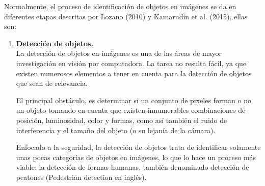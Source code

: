\documentclass[a4paper,12pt,oneside,spanish]{book}
\begin{document}
Normalmente, el proceso de identificación de objetos en imágenes se da en diferentes etapas descritas por Lozano (2010) y Kamarudin et al. (2015), ellas son:	
\begin{enumerate}[label=\alph*)]
	\item \textbf{Detección de objetos.}\\
		La detección de objetos en imágenes es una de las áreas de mayor investigación en visión por computadora. La tarea no resulta fácil, ya que existen numerosos elementos a tener en cuenta para la detección de objetos que sean de relevancia. \par
		
		El principal obstáculo, es determinar si un conjunto de pixeles forman o no un objeto tomando en cuenta que existen innumerables combinaciones de posición, luminosidad, color y formas, como así también el ruido de interferencia y el tamaño del objeto (o su lejanía de la cámara).\par
		
		Enfocado a la seguridad, la detección de objetos trata de identificar solamente unas pocas categorías de objetos en imágenes, lo que lo hace un proceso más viable: la detección de formas humanas, también denominado detección de peatones (Pedestrian detection en inglés).
		

\end{enumerate}
\end{document}
